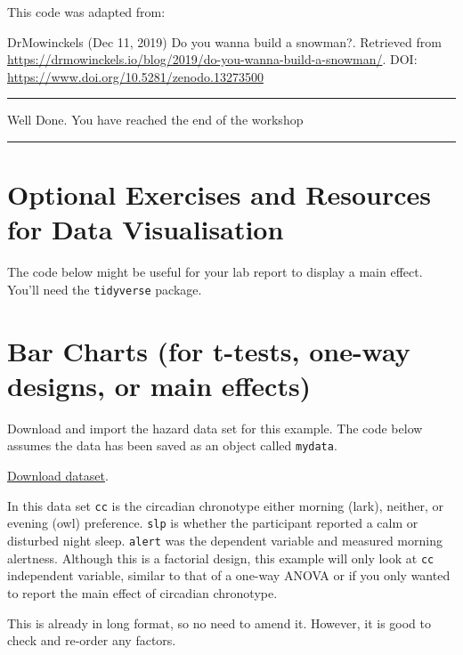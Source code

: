 \documentclass[
]{book}
\newenvironment{Shaded}{\begin{snugshade}}{\end{snugshade}}
\newcommand{\AttributeTok}[1]{\textcolor[rgb]{0.13,0.29,0.53}{#1}}
\newcommand{\FunctionTok}[1]{\textcolor[rgb]{0.13,0.29,0.53}{\textbf{#1}}}
\newcommand{\NormalTok}[1]{#1}
\newcommand{\OtherTok}[1]{\textcolor[rgb]{0.56,0.35,0.01}{#1}}
\newcommand{\SpecialCharTok}[1]{\textcolor[rgb]{0.81,0.36,0.00}{\textbf{#1}}}
\newcommand{\StringTok}[1]{\textcolor[rgb]{0.31,0.60,0.02}{#1}}
\let\oldsection\section
\renewcommand{\section}{\needspace{5\baselineskip}\oldsection}
\begin{document}
This code was adapted from:

DrMowinckels (Dec 11, 2019) Do you wanna build a snowman?. Retrieved from \url{https://drmowinckels.io/blog/2019/do-you-wanna-build-a-snowman/}. DOI: \url{https://www.doi.org/10.5281/zenodo.13273500}

\begin{center}\rule{0.5\linewidth}{0.5pt}\end{center}

Well Done. You have reached the end of the workshop

\begin{center}\rule{0.5\linewidth}{0.5pt}\end{center}

\section{Optional Exercises and Resources for Data Visualisation}\label{optional-exercises-and-resources-for-data-visualisation}

The code below might be useful for your lab report to display a main effect. You'll need the \texttt{tidyverse} package.

\section{Bar Charts (for t-tests, one-way designs, or main effects)}\label{bar-charts-for-t-tests-one-way-designs-or-main-effects}

Download and import the hazard data set for this example. The code below assumes the data has been saved as an object called \texttt{mydata}.

\href{data/earlybird.csv}{Download dataset}.

In this data set \texttt{cc} is the circadian chronotype either morning (lark), neither, or evening (owl) preference. \texttt{slp} is whether the participant reported a calm or disturbed night sleep. \texttt{alert} was the dependent variable and measured morning alertness. Although this is a factorial design, this example will only look at \texttt{cc} independent variable, similar to that of a one-way ANOVA or if you only wanted to report the main effect of circadian chronotype.

This is already in long format, so no need to amend it. However, it is good to check and re-order any factors.

\begin{Shaded}
\end{Shaded}
\end{document}
